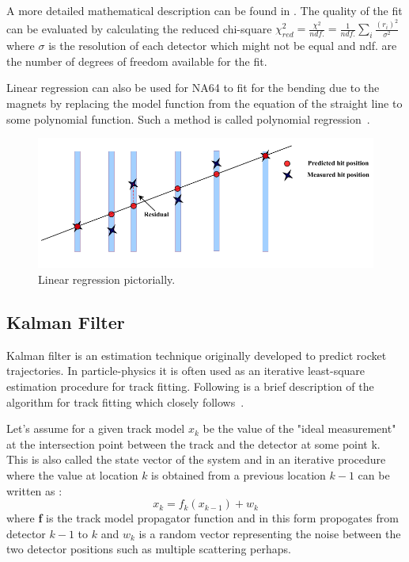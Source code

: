 A more detailed mathematical description can be found in \cite{Linear_regression}. The quality of the fit can be evaluated by calculating the reduced chi-square $\chi^2_{red}=\frac{\chi^2}{ndf.}=\frac{1}{ndf.}\sum_i \frac{(r_i)^2}{\sigma^2}$ where $\sigma$ is the resolution of each detector which might not be equal and ndf. are the number of degrees of freedom available for the fit.

Linear regression can also be used for NA64 to fit for the bending due to the magnets by replacing the model function from the equation of the straight line to some polynomial function. Such a method is called polynomial regression~\cite{STIGLER1974431}.

\begin{figure}[t!]
\centering
\includegraphics[width=\textwidth]{thesis_figures/linear_reg_new.png}
\caption{Linear regression pictorially. }
\label{fig:linear_regression}
\end{figure}

\subsection{Kalman Filter}
Kalman filter is an estimation technique originally developed to predict rocket trajectories. In particle-physics it is often used as an iterative least-square estimation procedure for track fitting. Following is a brief description of the algorithm for track fitting which closely follows~\cite{Fruhwirth:1987fm,Astier:412374}.

Let's assume for a given track model $x_k$ be the value of the "ideal measurement" at the intersection point between the track and the detector at some point k. This is also called the state vector of the system and in an iterative procedure where the value at location $k$ is obtained from a previous location $k-1$ can be written as :
\begin{equation}
  x_k = f_k(x_{k-1}) + w_k
\end{equation}
where \textbf{f} is the track model propagator function and in this form propogates from detector $k-1$ to $k$ and $w_k$ is a random vector representing the noise between the two detector positions such as multiple scattering perhaps.

